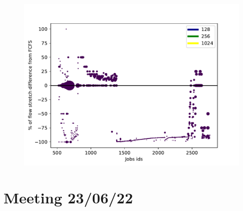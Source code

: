 \documentclass[a4paper]{article}
\begin{document}
\begin{figure}[H]\centering\includegraphics[width=1\linewidth]{MBSS/plot/FCFRSvsfcfsscore.pdf}\caption{}\end{figure}

\section{Meeting 23/06/22}
\end{document}
